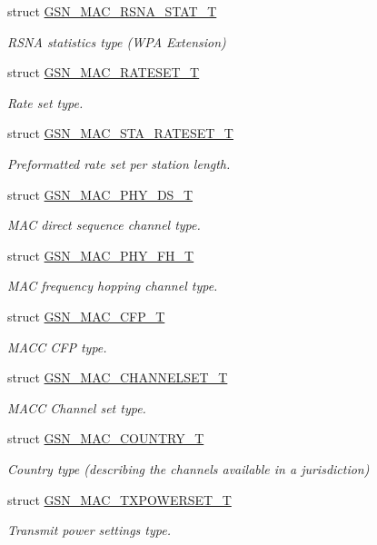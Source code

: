 \begin{DoxyCompactItemize}
struct \hyperlink{a00129}{GSN\_\-MAC\_\-RSNA\_\-STAT\_\-T}
\begin{DoxyCompactList}\small\item\em RSNA statistics type (WPA Extension) \end{DoxyCompactList}\item 
struct \hyperlink{a00125}{GSN\_\-MAC\_\-RATESET\_\-T}
\begin{DoxyCompactList}\small\item\em Rate set type. \end{DoxyCompactList}\item 
struct \hyperlink{a00132}{GSN\_\-MAC\_\-STA\_\-RATESET\_\-T}
\begin{DoxyCompactList}\small\item\em Preformatted rate set per station length. \end{DoxyCompactList}\item 
struct \hyperlink{a00119}{GSN\_\-MAC\_\-PHY\_\-DS\_\-T}
\begin{DoxyCompactList}\small\item\em MAC direct sequence channel type. \end{DoxyCompactList}\item 
struct \hyperlink{a00120}{GSN\_\-MAC\_\-PHY\_\-FH\_\-T}
\begin{DoxyCompactList}\small\item\em MAC frequency hopping channel type. \end{DoxyCompactList}\item 
struct \hyperlink{a00112}{GSN\_\-MAC\_\-CFP\_\-T}
\begin{DoxyCompactList}\small\item\em MACC CFP type. \end{DoxyCompactList}\item 
struct \hyperlink{a00114}{GSN\_\-MAC\_\-CHANNELSET\_\-T}
\begin{DoxyCompactList}\small\item\em MACC Channel set type. \end{DoxyCompactList}\item 
struct \hyperlink{a00115}{GSN\_\-MAC\_\-COUNTRY\_\-T}
\begin{DoxyCompactList}\small\item\em Country type (describing the channels available in a jurisdiction) \end{DoxyCompactList}\item 
struct \hyperlink{a00135}{GSN\_\-MAC\_\-TXPOWERSET\_\-T}
\begin{DoxyCompactList}\small\item\em Transmit power settings type. \end{DoxyCompactList}\item 

\end{DoxyCompactItemize}
